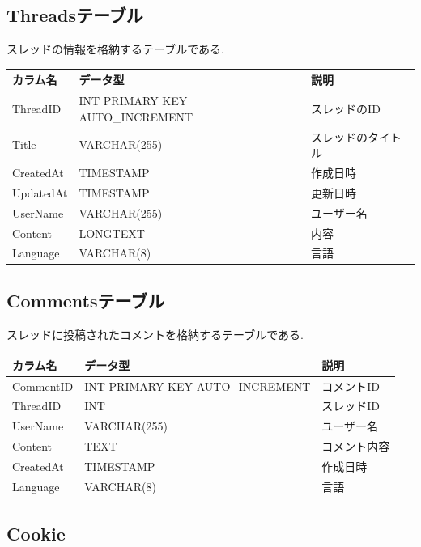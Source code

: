 \documentclass[b5paper,12pt,dvipdfmx]{jsreport}
\begin{document}
\subsection*{Threadsテーブル}

スレッドの情報を格納するテーブルである.

\begin{adjustbox}{width=\textwidth,center}
	\begin{tabular}{lll}
	\toprule
	\textbf{カラム名} & \textbf{データ型} & \textbf{説明} \\
	\midrule
	ThreadID   & INT PRIMARY KEY AUTO\_INCREMENT & スレッドのID \\
	Title      & VARCHAR(255) & スレッドのタイトル \\
	CreatedAt  & TIMESTAMP & 作成日時 \\
	UpdatedAt  & TIMESTAMP & 更新日時 \\
	UserName   & VARCHAR(255) & ユーザー名 \\
	Content    & LONGTEXT & 内容 \\
	Language   & VARCHAR(8) & 言語 \\
	\bottomrule
	\end{tabular}
\end{adjustbox}

\subsection*{Commentsテーブル}

スレッドに投稿されたコメントを格納するテーブルである.

\begin{adjustbox}{width=\textwidth,center}
	\begin{tabular}{lll}
	\toprule
	\textbf{カラム名} & \textbf{データ型} & \textbf{説明} \\
	\midrule
	CommentID  & INT PRIMARY KEY AUTO\_INCREMENT & コメントID \\
	ThreadID   & INT & スレッドID \\
	UserName   & VARCHAR(255) & ユーザー名 \\
	Content    & TEXT & コメント内容 \\
	CreatedAt  & TIMESTAMP & 作成日時 \\
	Language   & VARCHAR(8) & 言語 \\
	\bottomrule
	\end{tabular}
\end{adjustbox}

\subsection*{Cookie}
\end{document}
